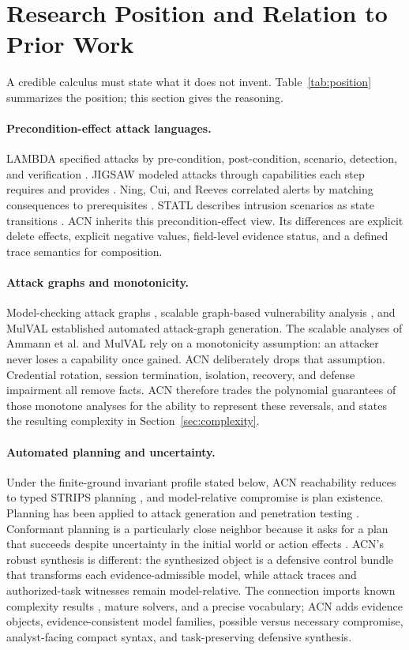 \documentclass[11pt,letterpaper]{article}
\theoremstyle{definition}
\begin{document}
\section{Research Position and Relation to Prior Work}\label{sec:related}

A credible calculus must state what it does not invent. Table~\ref{tab:position} summarizes the position; this section gives the reasoning.

\paragraph{Precondition-effect attack languages.} LAMBDA specified attacks by pre-condition, post-condition, scenario, detection, and verification \cite{cuppens2000}. JIGSAW modeled attacks through capabilities each step requires and provides \cite{templeton2000}. Ning, Cui, and Reeves correlated alerts by matching consequences to prerequisites \cite{ning2002}. STATL describes intrusion scenarios as state transitions \cite{statl}. ACN inherits this precondition-effect view. Its differences are explicit delete effects, explicit negative values, field-level evidence status, and a defined trace semantics for composition.

\paragraph{Attack graphs and monotonicity.} Model-checking attack graphs \cite{sheyner2002}, scalable graph-based vulnerability analysis \cite{ammann2002}, and MulVAL \cite{mulval} established automated attack-graph generation. The scalable analyses of Ammann et al. and MulVAL rely on a monotonicity assumption: an attacker never loses a capability once gained. ACN deliberately drops that assumption. Credential rotation, session termination, isolation, recovery, and defense impairment all remove facts. ACN therefore trades the polynomial guarantees of those monotone analyses for the ability to represent these reversals, and states the resulting complexity in Section~\ref{sec:complexity}.

\paragraph{Automated planning and uncertainty.} Under the finite-ground invariant profile stated below, ACN reachability reduces to typed STRIPS planning \cite{strips,pddl}, and model-relative compromise is plan existence. Planning has been applied to attack generation and penetration testing \cite{boddy2005,obes2010,hoffmann2015}. Conformant planning is a particularly close neighbor because it asks for a plan that succeeds despite uncertainty in the initial world or action effects \cite{cimatti2004}. ACN's robust synthesis is different: the synthesized object is a defensive control bundle that transforms each evidence-admissible model, while attack traces and authorized-task witnesses remain model-relative. The connection imports known complexity results \cite{bylander1994}, mature solvers, and a precise vocabulary; ACN adds evidence objects, evidence-consistent model families, possible versus necessary compromise, analyst-facing compact syntax, and task-preserving defensive synthesis.
\end{document}
